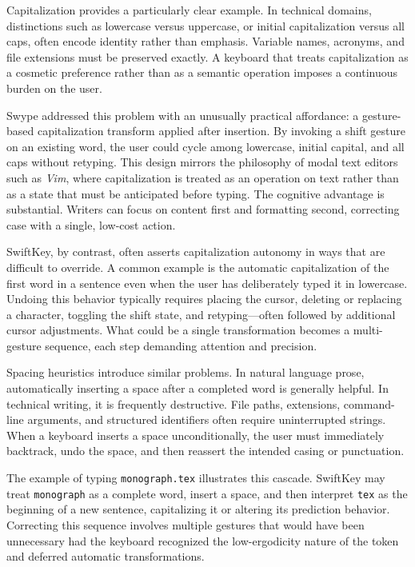 \documentclass[11pt]{article}
\begin{document}
Capitalization provides a particularly clear example. In technical domains, distinctions such as lowercase versus uppercase, or initial capitalization versus all caps, often encode identity rather than emphasis. Variable names, acronyms, and file extensions must be preserved exactly. A keyboard that treats capitalization as a cosmetic preference rather than as a semantic operation imposes a continuous burden on the user.

Swype addressed this problem with an unusually practical affordance: a gesture-based capitalization transform applied after insertion. By invoking a shift gesture on an existing word, the user could cycle among lowercase, initial capital, and all caps without retyping. This design mirrors the philosophy of modal text editors such as \textit{Vim}, where capitalization is treated as an operation on text rather than as a state that must be anticipated before typing. The cognitive advantage is substantial. Writers can focus on content first and formatting second, correcting case with a single, low-cost action.

SwiftKey, by contrast, often asserts capitalization autonomy in ways that are difficult to override. A common example is the automatic capitalization of the first word in a sentence even when the user has deliberately typed it in lowercase. Undoing this behavior typically requires placing the cursor, deleting or replacing a character, toggling the shift state, and retyping—often followed by additional cursor adjustments. What could be a single transformation becomes a multi-gesture sequence, each step demanding attention and precision.

Spacing heuristics introduce similar problems. In natural language prose, automatically inserting a space after a completed word is generally helpful. In technical writing, it is frequently destructive. File paths, extensions, command-line arguments, and structured identifiers often require uninterrupted strings. When a keyboard inserts a space unconditionally, the user must immediately backtrack, undo the space, and then reassert the intended casing or punctuation.

The example of typing \texttt{monograph.tex} illustrates this cascade. SwiftKey may treat \texttt{monograph} as a complete word, insert a space, and then interpret \texttt{tex} as the beginning of a new sentence, capitalizing it or altering its prediction behavior. Correcting this sequence involves multiple gestures that would have been unnecessary had the keyboard recognized the low-ergodicity nature of the token and deferred automatic transformations.
\end{document}
